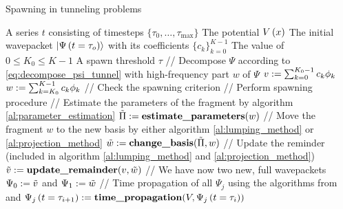 \begin{chapter}{Spawning in tunneling problems}
\begin{algorithm}
\caption{Spawning propagation method (simplified)}
\label{al:spawning_propagation}
\begin{algorithmic}
  \REQUIRE A series $t$ consisting of timesteps $\{\tau_0, \ldots, \tau_{\text{max}}\}$
  \REQUIRE The potential $V\left( x \right)$
  \REQUIRE The initial wavepacket $\Ket{\Psi\left( t=\tau_o \right)}$ with its coefficients $\{c_k\}_{k=0}^{K-1}$
  \REQUIRE The value of $0 \leq K_0 \leq K-1$
  \REQUIRE A spawn threshold $\tau$
    \STATE // Decompose $\Psi$ according to \eqref{eq:decompose_psi_tunnel} with high-frequency part $w$ of $\Psi$
    \STATE $v := \sum_{k=0}^{K_0-1} c_k \phi_k$
    \STATE $w := \sum_{k=K_0}^{K-1} c_k \phi_k$
    \STATE // Check the spawning criterion
      \STATE // Perform spawning procedure
      \STATE // Estimate the parameters of the fragment by algorithm \ref{al:parameter_estimation}
      \STATE $\tilde{\Pi} := \textbf{estimate\_parameters}(w)$
      \STATE // Move the fragment $w$ to the new basis by either algorithm \ref{al:lumping_method} or \ref{al:projection_method}
      \STATE $\tilde{w} := \textbf{change\_basis}(\tilde{\Pi}, w)$
      \STATE // Update the reminder (included in algorithm \ref{al:lumping_method} and \ref{al:projection_method})
      \STATE $\tilde{v} := \textbf{update\_remainder}(v, \tilde{w})$
      \STATE // We have now two new, full wavepackets
      \STATE $\Psi_0 := \tilde{v}$ and $\Psi_1 := \tilde{w}$
    \ENDIF
    \STATE // Time propagation of all $\Psi_j$ using the algorithms from \cite{FGL_semiclassical_dynamics} and \cite{BGH_nonadibatic_algorithms}
       \STATE $\Psi_j\left( t=\tau_{i+1} \right) := \textbf{time\_propagation}(V, \Psi_j\left( t=\tau_i \right))$
    \ENDFOR
  \ENDFOR
\end{algorithmic}
\end{algorithm}



\end{chapter}
